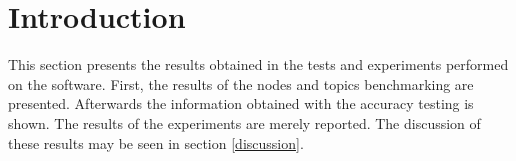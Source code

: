 \section{Introduction}

This section presents the results obtained in the tests and experiments performed on the software. 
First, the results of the nodes and topics benchmarking are presented. 
Afterwards the information obtained with the accuracy testing is shown. 
The results of the experiments are merely reported. 
The discussion of these results may be seen in section \ref{discussion}.